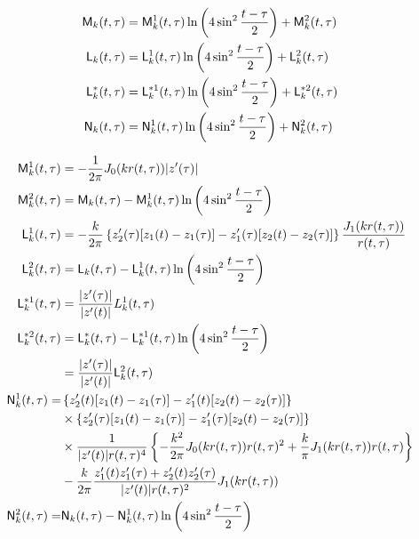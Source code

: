 \begin{subequations}
\begin{align}
  {\sf M}_k(t, \tau) &= {\sf M}_k^1(t, \tau)\ln\left(4\sin^2\frac{t-\tau}{2}\right) + {\sf M}_k^2(t, \tau) \\
  {\sf L}_k(t, \tau) &= {\sf L}_k^1(t, \tau)\ln\left(4\sin^2\frac{t-\tau}{2}\right) + {\sf L}_k^2(t, \tau) \\
  {\sf L}_k^*(t, \tau) &= {\sf L}_k^{*1}(t, \tau)\ln\left(4\sin^2\frac{t-\tau}{2}\right) + {\sf L}_k^{*2}(t, \tau) \\
  {\sf N}_k(t, \tau) &= {\sf N}_k^1(t, \tau)\ln\left(4\sin^2\frac{t-\tau}{2}\right) + {\sf N}_k^2(t, \tau) 
\end{align}
\end{subequations}

\begin{subequations}
\begin{align}
  {\sf M}_k^1(t,\tau) &= -\frac{1}{2\pi}J_0(kr(t,\tau))|z'(\tau)| \\
  {\sf M}_k^2(t,\tau) &= {\sf M}_k(t,\tau) - {\sf M}_k^1(t,\tau)\ln\left(4\sin^2\frac{t-\tau}{2}\right) \\
  {\sf L}_k^1(t,\tau) &= -\frac{k}{2\pi}\left\{z'_2(\tau)[z_1(t)-z_1(\tau)]-z'_1(\tau)[z_2(t)-z_2(\tau)]\right\}\frac{J_1(kr(t,\tau))}{r(t,\tau)} \\
  {\sf L}_k^2(t,\tau) &= {\sf L}_k(t,\tau) - {\sf L}_k^1(t,\tau)\ln\left(4\sin^2\frac{t-\tau}{2}\right) \\
  {\sf L}_k^{*1}(t,\tau) &= \frac{|z'(\tau)|}{|z'(t)|}L_k^1(t,\tau) \\
  {\sf L}_k^{*2}(t,\tau) &= {\sf L}_k^*(t,\tau) - {\sf L}_k^{*1}(t,\tau)\ln\left(4\sin^2\frac{t-\tau}{2}\right) \\
  &= \frac{|z'(\tau)|}{|z'(t)|}{\sf L}_k^2(t,\tau)\notag\\
  {\sf N}_k^1(t,\tau) =& \left\{z'_2(t)[z_1(t)-z_1(\tau)]-z'_1(t)[z_2(t)-z_2(\tau)]\right\}\notag \\
  &\times\left\{z'_2(\tau)[z_1(t)-z_1(\tau)]-z'_1(\tau)[z_2(t)-z_2(\tau)]\right\}\notag\\
  &\times\frac{1}{|z'(t)|r(t, \tau)^4}\left\{-\frac{k^2}{2\pi}J_0(kr(t,\tau))r(t,\tau)^2+\frac{k}{\pi}J_1(kr(t,\tau))r(t,\tau)\right\}\notag \\
  &-\frac{k}{2\pi}\frac{z'_1(t)z'_1(\tau)+z'_2(t)z'_2(\tau)}{|z'(t)|r(t,\tau)^2}J_1(kr(t,\tau))\notag \\
  {\sf N}_k^2(t,\tau) =& {\sf N}_k(t,\tau) - {\sf N}_k^1(t,\tau)\ln\left(4\sin^2\frac{t-\tau}{2}\right) 
\end{align}
\end{subequations}

